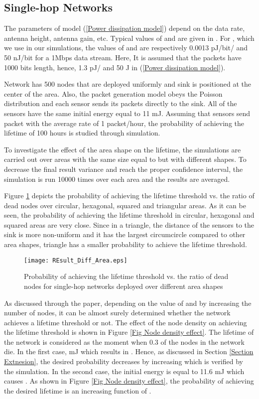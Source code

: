 \documentclass[conference]{IEEEtran}
\begin{document}
\subsection{Single-hop Networks}
The parameters of model (\ref{Power dissipation model}) depend on
the data rate, antenna height, antenna gain, etc. Typical values of
 and  are given in \cite{Heinzelman_Phd_Thes}. For , which we use in our simulations, the values of  and 
are respectively 0.0013 pJ/bit/ and 50 nJ/bit for a
1Mbps data stream. Here, It is assumed that the packets have 1000
bits length, hence, 1.3 pJ/ and 50 J in
(\ref{Power dissipation model}).

Network has 500 nodes that are deployed uniformly and sink is
positioned at the center of the area. Also, the packet generation
model obeys the Poisson distribution and each sensor sends its
packets directly to the sink. All of the sensors have the same
initial energy equal to 11 mJ. Assuming that sensors send packet
with the average rate of 1 packet/hour, the probability of achieving
the lifetime of 100 hours is studied through simulation.

To investigate the effect of the area shape on the lifetime, the
simulations are carried out over areas with the same size equal to
 but with different shapes. To decrease the
final result variance and reach the proper confidence interval, the
simulation is run 10000 times over each area and the results are
averaged.

Figure \ref{Beta Diff area shapes} depicts the probability of
achieving the lifetime threshold vs. the ratio of dead nodes over
circular, hexagonal, squared and triangular areas. As it can be
seen, the probability of achieving the lifetime threshold in
circular, hexagonal and squared areas are very close. Since in a
triangle, the distance of the sensors to the sink is more
non-uniform and it has the largest circumcircle compared to other
area shapes, triangle has a smaller probability to achieve the
lifetime threshold.

\begin{figure}[!h]
\centering
\texttt{[image: REsult\_Diff\_Area.eps]}
\caption{Probability of achieving the lifetime threshold vs. the
ratio of dead nodes for single-hop networks deployed over different
area shapes} \label{Beta Diff area shapes}
\end{figure}

As discussed through the paper, depending on the value of  and by increasing the number of nodes, it can be almost
surely determined whether the network achieves a lifetime threshold
or not. The effect of the node density on achieving the lifetime
threshold is shown in Figure \ref{Fig Node density effect}. The
lifetime of the network is considered as the moment when 0.3 of the
nodes in the network die. In the first case,  mJ which
results in . Hence, as discussed in Section
\ref{Section Extnesion}, the desired probability decreases by
increasing  which is verified by the simulation. In the second
case, the initial energy is equal to 11.6 mJ which causes . As shown in Figure \ref{Fig Node density effect},
the probability of achieving the desired lifetime is an increasing
function of .
\end{document}
